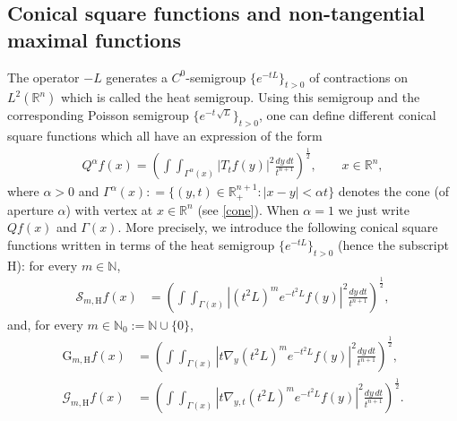 \documentclass[11pt, a4paper,leqno]{amsart}
\theoremstyle{plain}
\theoremstyle{definition}
\theoremstyle{remark}
\numberwithin{equation}{section}
\def \R{ \mathbb{R} }
\def \hh{ \mathrm{H} }
\def \iint{\int\!\!\!\int}
\begin{document}

\subsection{Conical square functions and non-tangential maximal functions}
%
%

The operator $-L$ generates a $C^0$-semigroup $\{e^{-t L}\}_{t>0}$ of contractions on $L^2(\mathbb{R}^n)$ which is called the heat semigroup. Using this semigroup and the corresponding Poisson semigroup $\{e^{-t\,\sqrt{L}}\}_{t>0}$, one can define different conical square functions which all have an expression of the form
\begin{align}\label{squarealpha}
Q^{\alpha} f(x)
=\left(\iint_{\Gamma^{\alpha}(x)}|T_t f(y)|^2 \frac{dy \, dt}{t^{n+1}}\right)^{\frac{1}{2}},
\qquad
x\in\R^n,
\end{align}
where $\alpha>0$ and $\Gamma^{\alpha}(x): =\{(y,t)\in \R^{n+1}_+: |x-y|<\alpha t\}$ denotes the cone (of aperture $\alpha$) with vertex at $x\in\R^n$ (see \eqref{cone}).  When $\alpha=1$ we just write $Qf(x)$ and $\Gamma(x)$.
More precisely, we introduce the following conical square functions written in terms of the heat semigroup $\{e^{-t L}\}_{t>0}$ (hence the subscript $\hh$): for every $m\in \mathbb{N}$,
\begin{align} \label{square-H-1}
\mathcal{S}_{m,\hh}f(x) & = \left(\iint_{\Gamma(x)}|(t^2L)^{m} e^{-t^2L}f(y)|^2 \frac{dy \, dt}{t^{n+1}}\right)^{\frac{1}{2}},
\end{align}
and, for every $m\in \mathbb{N}_0:=\mathbb{N}\cup\{0\}$,
\begin{align}
\mathrm{G}_{m,\hh}f(x)& =\left(\iint_{\Gamma(x)}|t\nabla_y(t^2L)^m e^{-t^2L}f(y)|^2 \frac{dy \, dt}{t^{n+1}}\right)^{\frac{1}{2}},
\label{square-H-2}\\[4pt]
\mathcal{G}_{m,\hh}f(x)
&
=
\left(\iint_{\Gamma(x)}|t\nabla_{y,t}(t^2L)^m e^{-t^2L}f(y)|^2 \frac{dy \, dt}{t^{n+1}}\right)^{\frac{1}{2}}.
\label{square-H-3}
\end{align}
\end{document}
